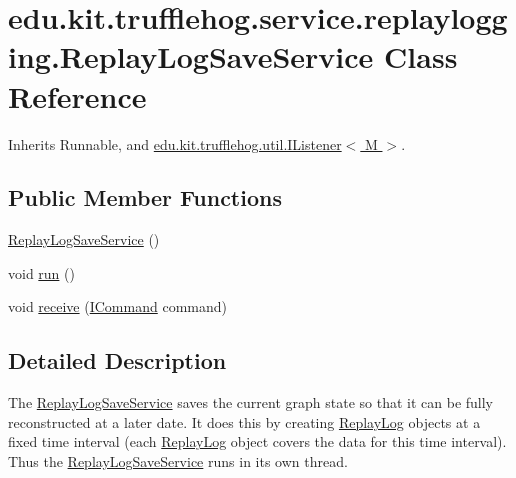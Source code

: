 \hypertarget{classedu_1_1kit_1_1trufflehog_1_1service_1_1replaylogging_1_1_replay_log_save_service}{}\section{edu.\+kit.\+trufflehog.\+service.\+replaylogging.\+Replay\+Log\+Save\+Service Class Reference}
\label{classedu_1_1kit_1_1trufflehog_1_1service_1_1replaylogging_1_1_replay_log_save_service}


Inherits Runnable, and \hyperlink{interfaceedu_1_1kit_1_1trufflehog_1_1util_1_1_i_listener}{edu.\+kit.\+trufflehog.\+util.\+I\+Listener$<$ M $>$}.

\subsection*{Public Member Functions}
\begin{DoxyCompactItemize}
\item 
\hyperlink{classedu_1_1kit_1_1trufflehog_1_1service_1_1replaylogging_1_1_replay_log_save_service_a6c679cb4574f24f914e3c0402d444d40}{Replay\+Log\+Save\+Service} ()
\item 
void \hyperlink{classedu_1_1kit_1_1trufflehog_1_1service_1_1replaylogging_1_1_replay_log_save_service_ae78e77d574e2e7f8791152f03e2f350a}{run} ()
\item 
void \hyperlink{classedu_1_1kit_1_1trufflehog_1_1service_1_1replaylogging_1_1_replay_log_save_service_aa6242b72579d7b865bdb096cf24508a4}{receive} (\hyperlink{interfaceedu_1_1kit_1_1trufflehog_1_1command_1_1_i_command}{I\+Command} command)
\end{DoxyCompactItemize}


\subsection{Detailed Description}
The \hyperlink{classedu_1_1kit_1_1trufflehog_1_1service_1_1replaylogging_1_1_replay_log_save_service}{Replay\+Log\+Save\+Service} saves the current graph state so that it can be fully reconstructed at a later date. It does this by creating \hyperlink{classedu_1_1kit_1_1trufflehog_1_1service_1_1replaylogging_1_1_replay_log}{Replay\+Log} objects at a fixed time interval (each \hyperlink{classedu_1_1kit_1_1trufflehog_1_1service_1_1replaylogging_1_1_replay_log}{Replay\+Log} object covers the data for this time interval). Thus the \hyperlink{classedu_1_1kit_1_1trufflehog_1_1service_1_1replaylogging_1_1_replay_log_save_service}{Replay\+Log\+Save\+Service} runs in its own thread. 

